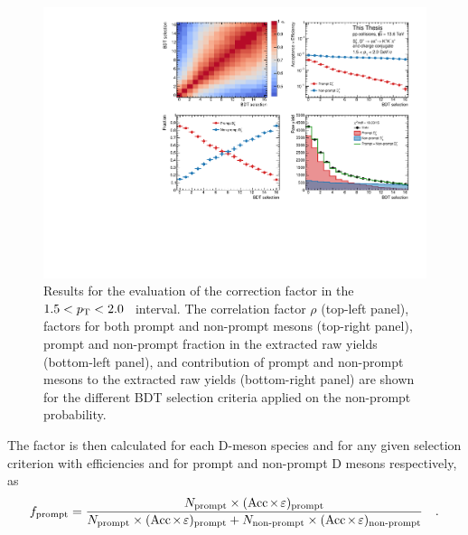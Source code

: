 \begin{figure}[htb]
    \begin{center}
    \includegraphics[width=\textwidth]{Figures/Chapter 6/DsPromptFrac.pdf}
    \caption{Results for the evaluation of the \ds \fp correction factor in the \mbox{$1.5<p_\mathrm{T}<2.0$~\gevc} interval. The correlation factor $\rho$ (top-left panel), \mbox{\aeff} factors for both prompt and non-prompt \ds mesons (top-right panel), prompt and non-prompt fraction in the extracted \ds raw yields (bottom-left panel), and contribution of prompt and non-prompt \ds mesons to the extracted raw yields (bottom-right panel) are shown for the different BDT selection criteria applied on the non-prompt probability.} 
    \label{fig:fp} 
    \end{center}
\end{figure}

The \fp factor is then calculated for each D-meson species and for any given selection criterion with efficiencies \aeffp and \aeffnp for prompt and non-prompt D mesons respectively, as
\begin{equation*}
    f_\mathrm{prompt} = \frac{N_\mathrm{prompt}\times(\mathrm{Acc}\mkern-2mu\times\mkern-2mu\varepsilon)_\mathrm{prompt}}{N_\mathrm{prompt}\times(\mathrm{Acc}\mkern-2mu\times\mkern-2mu\varepsilon)_\mathrm{prompt} + N_\mathrm{non\text{-}prompt}\times(\mathrm{Acc}\mkern-2mu\times\mkern-2mu\varepsilon)_\mathrm{non\text{-}prompt}}\quad .
\end{equation*}

